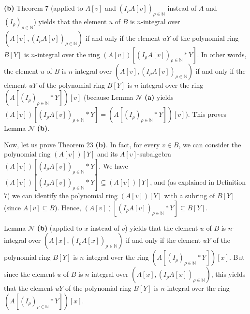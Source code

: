\documentclass[12pt,final,notitlepage,onecolumn]{article}%
\begin{document}
\textbf{(b)} Theorem 7 (applied to $A\left[  v\right]  $ and $\left(  I_{\rho
}A\left[  v\right]  \right)  _{\rho\in\mathbb{N}}$ instead of $A$ and $\left(
I_{\rho}\right)  _{\rho\in\mathbb{N}}$) yields that the element $u$ of $B$ is
$n$-integral over $\left(  A\left[  v\right]  ,\left(  I_{\rho}A\left[
v\right]  \right)  _{\rho\in\mathbb{N}}\right)  $ if and only if the element
$uY$ of the polynomial ring $B\left[  Y\right]  $ is $n$-integral over the
ring $\left(  A\left[  v\right]  \right)  \left[  \left(  I_{\rho}A\left[
v\right]  \right)  _{\rho\in\mathbb{N}}\ast Y\right]  $. In other words, the
element $u$ of $B$ is $n$-integral over $\left(  A\left[  v\right]  ,\left(
I_{\rho}A\left[  v\right]  \right)  _{\rho\in\mathbb{N}}\right)  $ if and only
if the element $uY$ of the polynomial ring $B\left[  Y\right]  $ is
$n$-integral over the ring $\left(  A\left[  \left(  I_{\rho}\right)
_{\rho\in\mathbb{N}}\ast Y\right]  \right)  \left[  v\right]  $ (because Lemma
$\mathcal{N}$ \textbf{(a)} yields $\left(  A\left[  v\right]  \right)  \left[
\left(  I_{\rho}A\left[  v\right]  \right)  _{\rho\in\mathbb{N}}\ast Y\right]
=\left(  A\left[  \left(  I_{\rho}\right)  _{\rho\in\mathbb{N}}\ast Y\right]
\right)  \left[  v\right]  $). This proves Lemma $\mathcal{N}$ \textbf{(b)}.

Now, let us prove Theorem 23 \textbf{(b)}. In fact, for every $v\in B$, we can
consider the polynomial ring $\left(  A\left[  v\right]  \right)  \left[
Y\right]  $ and its $A\left[  v\right]  $-subalgebra $\left(  A\left[
v\right]  \right)  \left[  \left(  I_{\rho}A\left[  v\right]  \right)
_{\rho\in\mathbb{N}}\ast Y\right]  $. We have $\left(  A\left[  v\right]
\right)  \left[  \left(  I_{\rho}A\left[  v\right]  \right)  _{\rho
\in\mathbb{N}}\ast Y\right]  \subseteq\left(  A\left[  v\right]  \right)
\left[  Y\right]  $, and (as explained in Definition 7) we can identify the
polynomial ring $\left(  A\left[  v\right]  \right)  \left[  Y\right]  $ with
a subring of $B\left[  Y\right]  $ (since $A\left[  v\right]  \subseteq B$).
Hence, $\left(  A\left[  v\right]  \right)  \left[  \left(  I_{\rho}A\left[
v\right]  \right)  _{\rho\in\mathbb{N}}\ast Y\right]  \subseteq B\left[
Y\right]  $.

Lemma $\mathcal{N}$ \textbf{(b)} (applied to $x$ instead of $v$) yields that
the element $u$ of $B$ is $n$-integral over $\left(  A\left[  x\right]
,\left(  I_{\rho}A\left[  x\right]  \right)  _{\rho\in\mathbb{N}}\right)  $ if
and only if the element $uY$ of the polynomial ring $B\left[  Y\right]  $ is
$n$-integral over the ring $\left(  A\left[  \left(  I_{\rho}\right)
_{\rho\in\mathbb{N}}\ast Y\right]  \right)  \left[  x\right]  $. But since the
element $u$ of $B$ is $n$-integral over $\left(  A\left[  x\right]  ,\left(
I_{\rho}A\left[  x\right]  \right)  _{\rho\in\mathbb{N}}\right)  $, this
yields that the element $uY$ of the polynomial ring $B\left[  Y\right]  $ is
$n$-integral over the ring $\left(  A\left[  \left(  I_{\rho}\right)
_{\rho\in\mathbb{N}}\ast Y\right]  \right)  \left[  x\right]  $.
\end{document}
